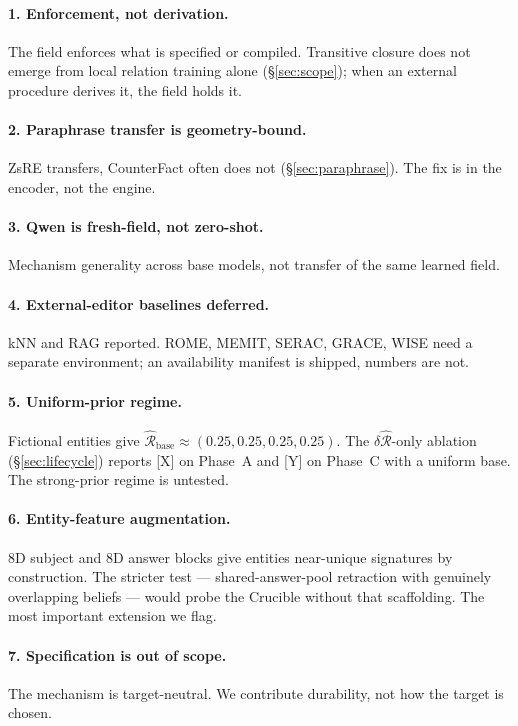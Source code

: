 \documentclass[11pt,twocolumn]{article}
\newcommand{\Cohbase}{\widehat{\mathcal{R}}_{\mathrm{base}}}
\newcommand{\dCoh}{\delta\widehat{\mathcal{R}}}
\newcommand{\PH}[1]{[\textsc{#1}]}
\theoremstyle{plain}
\begin{document}
\paragraph{1. Enforcement, not derivation.}
The field enforces what is specified or compiled. Transitive closure does not emerge from local relation training alone (\S\ref{sec:scope}); when an external procedure derives it, the field holds it.

\paragraph{2. Paraphrase transfer is geometry-bound.}
ZsRE transfers, CounterFact often does not (\S\ref{sec:paraphrase}). The fix is in the encoder, not the engine.

\paragraph{3. Qwen is fresh-field, not zero-shot.}
Mechanism generality across base models, not transfer of the same learned field.

\paragraph{4. External-editor baselines deferred.}
kNN and RAG reported. ROME, MEMIT, SERAC, GRACE, WISE need a separate environment; an availability manifest is shipped, numbers are not.

\paragraph{5. Uniform-prior regime.}
Fictional entities give $\Cohbase \approx (0.25, 0.25, 0.25, 0.25)$. The $\dCoh$-only ablation (\S\ref{sec:lifecycle}) reports \PH{X} on Phase~A and \PH{Y} on Phase~C with a uniform base. The strong-prior regime is untested.

\paragraph{6. Entity-feature augmentation.}
8D subject and 8D answer blocks give entities near-unique signatures by construction. The stricter test --- shared-answer-pool retraction with genuinely overlapping beliefs --- would probe the Crucible without that scaffolding. The most important extension we flag.

\paragraph{7. Specification is out of scope.}
The mechanism is target-neutral. We contribute durability, not how the target is chosen.
\end{document}
